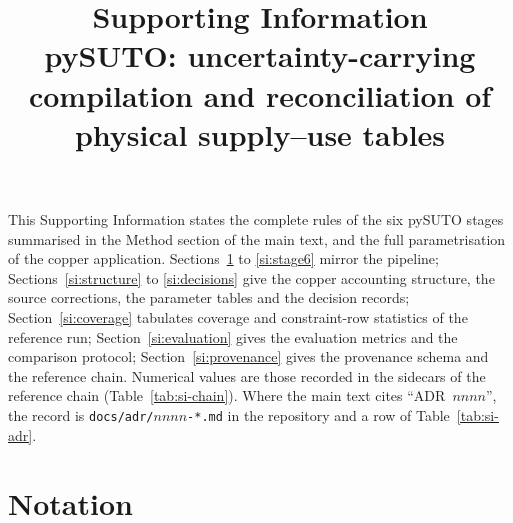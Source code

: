 \documentclass[11pt]{article}
\title{Supporting Information\\[2pt]
\large pySUTO: uncertainty-carrying compilation and reconciliation of
physical supply--use tables}
\author{}
\date{}
\begin{document}
\maketitle

This Supporting Information states the complete rules of the six pySUTO
stages summarised in the Method section of the main text, and the full
parametrisation of the copper application. Sections~\ref{si:notation} to
\ref{si:stage6} mirror the pipeline; Sections~\ref{si:structure} to
\ref{si:decisions} give the copper accounting structure, the source
corrections, the parameter tables and the decision records;
Section~\ref{si:coverage} tabulates coverage and constraint-row statistics
of the reference run; Section~\ref{si:evaluation} gives the evaluation
metrics and the comparison protocol; Section~\ref{si:provenance} gives the
provenance schema and the reference chain. Numerical values are those
recorded in the sidecars of the reference chain (Table~\ref{tab:si-chain}).
Where the main text cites ``ADR~$nnnn$'', the record is
\texttt{docs/adr/$nnnn$-*.md} in the repository and a row of
Table~\ref{tab:si-adr}.

\section{Notation}\label{si:notation}
\end{document}
